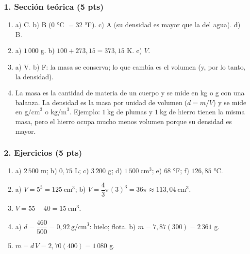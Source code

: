 \documentclass[12pt, letterpaper]{article}
\begin{document}
\subsubsection*{1. Sección teórica (5 pts)}
\begin{enumerate}[leftmargin=*, label=\textbf{\arabic*.}, itemsep=0.35em]
  \item a) C. \quad b) B ($0$ °C $=32$ °F). \quad
        c) A (su densidad es mayor que la del agua). \quad d) B.
  \item a) $1\,000$ g. \quad b) $100+273{,}15=373{,}15$ K. \quad c) $V$.
  \item a) V. \quad b) F: la masa se conserva; lo que cambia es el volumen
        (y, por lo tanto, la densidad).
  \item La masa es la cantidad de materia de un cuerpo y se mide en kg o g
        con una balanza. La densidad es la masa por unidad de volumen
        ($d=m/V$) y se mide en $\text{g/cm}^3$ o $\text{kg/m}^3$. Ejemplo:
        $1\ \text{kg}$ de plumas y $1\ \text{kg}$ de hierro tienen la misma masa,
        pero el hierro ocupa mucho menos volumen porque su densidad es mayor.
\end{enumerate}

\subsubsection*{2. Ejercicios (5 pts)}
\begin{enumerate}[leftmargin=*, label=\textbf{\arabic*.}, itemsep=0.35em]
  \item a) $2\,500$ m; \quad b) $0{,}75$ L; \quad c) $3\,200$ g; \quad
        d) $1\,500\ \text{cm}^3$; \quad e) $68$ °F; \quad f) $126{,}85$ °C.
  \item a) $V=5^3=125\ \text{cm}^3$; \quad
        b) $V=\dfrac{4}{3}\pi(3)^3=36\pi\approx113{,}04\ \text{cm}^3$.
  \item $V=55-40=15\ \text{cm}^3$.
  \item a) $d=\dfrac{460}{500}=0{,}92\ \text{g/cm}^3$: hielo; flota. \quad
        b) $m=7{,}87(300)=2\,361$ g.
  \item $m=d\,V=2{,}70(400)=1\,080$ g.
\end{enumerate}
\end{document}
